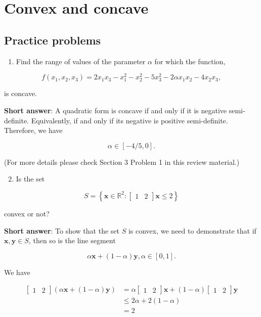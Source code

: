 \section{Convex and concave}

\subsection{Practice problems}
\begin{enumerate}
	\item Find the range of values of the parameter \(\alpha\) for which the function,
\end{enumerate}

\[
	f\left(x_{1}, x_{2}, x_{3}\right)=2 x_{1} x_{3}-x_{1}^{2}-x_{2}^{2}-5 x_{3}^{2}-2 \alpha x_{1} x_{2}-4 x_{2} x_{3},
\]

is concave.

\textbf{Short answer}: A quadratic form is concave if and only if it is negative semi-definite. Equivalently, if and only if its negative is positive semi-definite. Therefore, we have

\[
	\alpha \in[-4 / 5,0] .
\]

(For more details please check Section 3 Problem 1 in this review material.)

\begin{enumerate}
	\setcounter{enumi}{1}
	\item Is the set
\end{enumerate}

\[
	S=\left\{\boldsymbol{x} \in \mathbb{R}^{2}:\left[\begin{array}{ll}
		1 & 2
	\end{array}\right] \boldsymbol{x} \leq 2\right\}
\]

convex or not?

\textbf{Short answer}: To show that the set \(S\) is convex, we need to demonstrate that if \(\boldsymbol{x}, \boldsymbol{y} \in S\), then so is the line segment

\[
	\alpha \boldsymbol{x}+(1-\alpha) \boldsymbol{y}, \alpha \in[0,1] .
\]

We have

\[
	\begin{aligned}
		{\left[\begin{array}{ll}
				1 & 2
			\end{array}\right](\alpha \boldsymbol{x}+(1-\alpha) \boldsymbol{y}) } & =\alpha\left[\begin{array}{ll}
			1 & 2
		\end{array}\right] \boldsymbol{x}+(1-\alpha)\left[\begin{array}{ll}
			1 & 2
		\end{array}\right] \boldsymbol{y} \\
		& \leq 2 \alpha+2(1-\alpha) \\
		& =2
	\end{aligned}
\]

